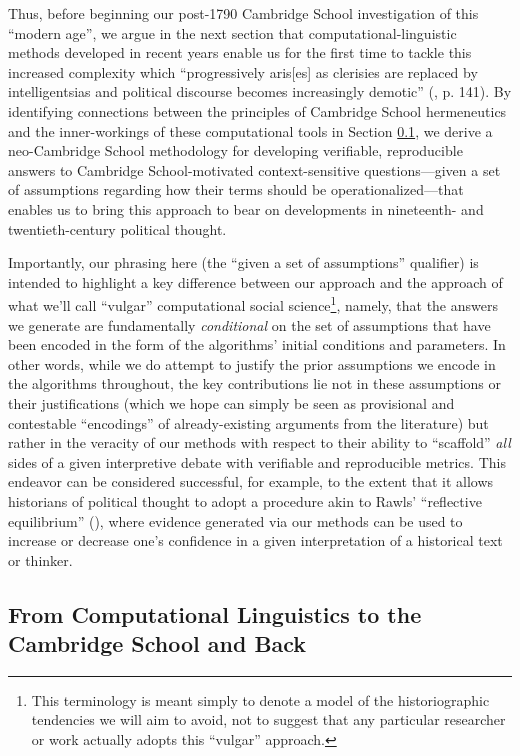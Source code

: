 \documentclass[11pt]{article}
\begin{document}
Thus, before beginning our post-1790 Cambridge School investigation of this ``modern age'', we argue in the next section that computational-linguistic methods developed in recent years enable us for the first time to tackle this increased complexity which ``progressively aris[es] as clerisies are replaced by intelligentsias and political discourse becomes increasingly demotic'' (\cite{pocock_political_2009}, p. 141). By identifying connections between the principles of Cambridge School hermeneutics and the inner-workings of these computational tools in Section \ref{sec:methods-ling-cambridge}, we derive a neo-Cambridge School methodology for developing verifiable, reproducible answers to Cambridge School-motivated context-sensitive questions---given a set of assumptions regarding how their terms should be operationalized---that enables us to bring this approach to bear on developments in nineteenth- and twentieth-century political thought.

Importantly, our phrasing here (the ``given a set of assumptions'' qualifier) is intended to highlight a key difference between our approach and the approach of what we'll call ``vulgar'' computational social science\footnote{This terminology is meant simply to denote a model of the historiographic tendencies we will aim to avoid, not to suggest that any particular researcher or work actually adopts this ``vulgar'' approach.}, namely, that the answers we generate are fundamentally \textit{conditional} on the set of assumptions that have been encoded in the form of the algorithms' initial conditions and parameters. In other words, while we do attempt to justify the prior assumptions we encode in the algorithms throughout, the key contributions lie not in these assumptions or their justifications (which we hope can simply be seen as provisional and contestable ``encodings'' of already-existing arguments from the literature) but rather in the veracity of our methods with respect to their ability to ``scaffold'' \textit{all} sides of a given interpretive debate with verifiable and reproducible metrics. This endeavor can be considered successful, for example, to the extent that it allows historians of political thought to adopt a procedure akin to Rawls' ``reflective equilibrium'' (\cite{rawls_outline_1951}), where evidence generated via our methods can be used to increase or decrease one's confidence in a given interpretation of a historical text or thinker.
	
\subsection{From Computational Linguistics to the Cambridge School and Back}\label{sec:methods-ling-cambridge}
	
\end{document}
